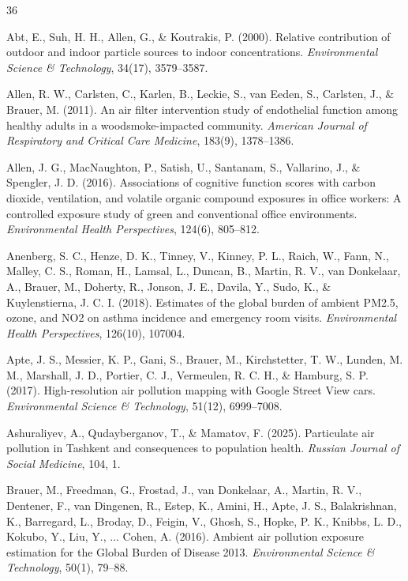\documentclass[11pt,a4paper]{article}
\begin{document}

\begin{thebibliography}{36}

Abt, E., Suh, H. H., Allen, G., \& Koutrakis, P. (2000). Relative contribution of outdoor and indoor particle sources to indoor concentrations. \textit{Environmental Science \& Technology}, 34(17), 3579--3587.

Allen, R. W., Carlsten, C., Karlen, B., Leckie, S., van Eeden, S., Carlsten, J., \& Brauer, M. (2011). An air filter intervention study of endothelial function among healthy adults in a woodsmoke-impacted community. \textit{American Journal of Respiratory and Critical Care Medicine}, 183(9), 1378--1386.

Allen, J. G., MacNaughton, P., Satish, U., Santanam, S., Vallarino, J., \& Spengler, J. D. (2016). Associations of cognitive function scores with carbon dioxide, ventilation, and volatile organic compound exposures in office workers: A controlled exposure study of green and conventional office environments. \textit{Environmental Health Perspectives}, 124(6), 805--812.

Anenberg, S. C., Henze, D. K., Tinney, V., Kinney, P. L., Raich, W., Fann, N., Malley, C. S., Roman, H., Lamsal, L., Duncan, B., Martin, R. V., van Donkelaar, A., Brauer, M., Doherty, R., Jonson, J. E., Davila, Y., Sudo, K., \& Kuylenstierna, J. C. I. (2018). Estimates of the global burden of ambient PM2.5, ozone, and NO2 on asthma incidence and emergency room visits. \textit{Environmental Health Perspectives}, 126(10), 107004.

Apte, J. S., Messier, K. P., Gani, S., Brauer, M., Kirchstetter, T. W., Lunden, M. M., Marshall, J. D., Portier, C. J., Vermeulen, R. C. H., \& Hamburg, S. P. (2017). High-resolution air pollution mapping with Google Street View cars. \textit{Environmental Science \& Technology}, 51(12), 6999--7008.

Ashuraliyev, A., Qudayberganov, T., \& Mamatov, F. (2025). Particulate air pollution in Tashkent and consequences to population health. \textit{Russian Journal of Social Medicine}, 104, 1.

Brauer, M., Freedman, G., Frostad, J., van Donkelaar, A., Martin, R. V., Dentener, F., van Dingenen, R., Estep, K., Amini, H., Apte, J. S., Balakrishnan, K., Barregard, L., Broday, D., Feigin, V., Ghosh, S., Hopke, P. K., Knibbs, L. D., Kokubo, Y., Liu, Y., ... Cohen, A. (2016). Ambient air pollution exposure estimation for the Global Burden of Disease 2013. \textit{Environmental Science \& Technology}, 50(1), 79--88.


\end{thebibliography}
\end{document}
